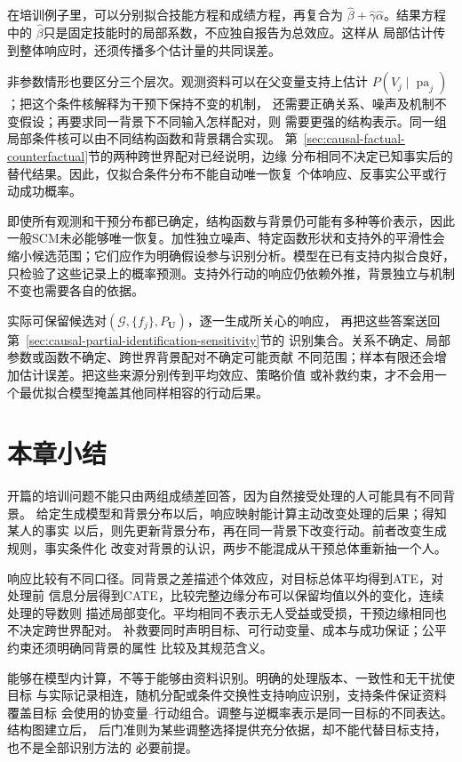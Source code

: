 在培训例子里，可以分别拟合技能方程和成绩方程，再复合为
\(\widehat\beta+\widehat\gamma\widehat\alpha\)。结果方程中的
\(\widehat\beta\)只是固定技能时的局部系数，不应独自报告为总效应。这样从
局部估计传到整体响应时，还须传播多个估计量的共同误差。

非参数情形也要区分三个层次。观测资料可以在父变量支持上估计
\(P(V_j\mid\operatorname{pa}_j)\)；把这个条件核解释为干预下保持不变的机制，
还需要正确关系、噪声及机制不变假设；再要求同一背景下不同输入怎样配对，则
需要更强的结构表示。同一组局部条件核可以由不同结构函数和背景耦合实现。
第~\ref{sec:causal-factual-counterfactual}节的两种跨世界配对已经说明，边缘
分布相同不决定已知事实后的替代结果。因此，仅拟合条件分布不能自动唯一恢复
个体响应、反事实公平或行动成功概率。

即使所有观测和干预分布都已确定，结构函数与背景仍可能有多种等价表示，因此一般SCM未必能够唯一恢复。加性独立噪声、特定函数形状和支持外的平滑性会缩小候选范围；它们应作为明确假设参与识别分析。模型在已有支持内拟合良好，只检验了这些记录上的概率预测。支持外行动的响应仍依赖外推，背景独立与机制不变也需要各自的依据。

实际可保留候选对\((\mathcal G,\{f_j\},P_{\bm U})\)，逐一生成所关心的响应，
再把这些答案送回第~\ref{sec:causal-partial-identification-sensitivity}节的
识别集合。关系不确定、局部参数或函数不确定、跨世界背景配对不确定可能贡献
不同范围；样本有限还会增加估计误差。把这些来源分别传到平均效应、策略价值
或补救约束，才不会用一个最优拟合模型掩盖其他同样相容的行动后果。

\section{本章小结}
\label{sec:causal-inference-summary}

开篇的培训问题不能只由两组成绩差回答，因为自然接受处理的人可能具有不同背景。
给定生成模型和背景分布以后，响应映射能计算主动改变处理的后果；得知某人的事实
以后，则先更新背景分布，再在同一背景下改变行动。前者改变生成规则，事实条件化
改变对背景的认识，两步不能混成从干预总体重新抽一个人。

响应比较有不同口径。同背景之差描述个体效应，对目标总体平均得到ATE，对处理前
信息分层得到CATE，比较完整边缘分布可以保留均值以外的变化，连续处理的导数则
描述局部变化。平均相同不表示无人受益或受损，干预边缘相同也不决定跨世界配对。
补救要同时声明目标、可行动变量、成本与成功保证；公平约束还须明确同背景的属性
比较及其规范含义。

能够在模型内计算，不等于能够由资料识别。明确的处理版本、一致性和无干扰使目标
与实际记录相连，随机分配或条件交换性支持响应识别，支持条件保证资料覆盖目标
会使用的协变量--行动组合。调整与逆概率表示是同一目标的不同表达。结构图建立后，
后门准则为某些调整选择提供充分依据，却不能代替目标支持，也不是全部识别方法的
必要前提。


